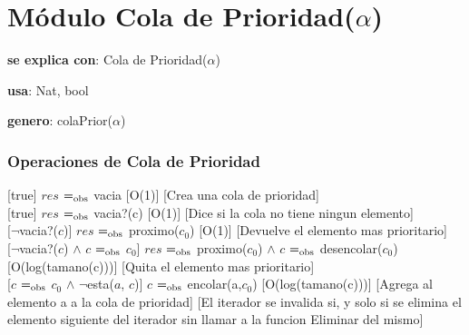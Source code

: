 


\section{Módulo Cola de Prioridad($\alpha$)}

\begin{Interfaz}

  \textbf{se explica con}: Cola de Prioridad($\alpha$)

  \textbf{usa}: Nat, bool
  
  \textbf{genero}: colaPrior($\alpha$)


\subsubsection{Operaciones de Cola de Prioridad}

  [true]
  {$res$ $=_{\mathrm{obs}}$ vacia}
  [O(1)]
  [Crea una cola de prioridad]\\ 
  
  [true]
  {$res$ $=_{\mathrm{obs}}$ vacia?(c)}
  [O(1)]
  [Dice si la cola no tiene ningun elemento]\\ 

  [$\neg$vacia?($c$)]
  {$res$ $=_{\mathrm{obs}}$ proximo($c_0$)}
  [O(1)]
  [Devuelve el elemento mas prioritario]\\   
  
  [$\neg$vacia?($c$) $\land$ $c$ $=_{\mathrm{obs}}$ $c_0$]
  {$res$ $=_{\mathrm{obs}}$ proximo($c_0$) $\land$ $c$ $=_{\mathrm{obs}}$ desencolar($c_0$)}
  [O(log(tamano(c)))]
  [Quita el elemento mas prioritario]\\   
  
  [$c$ $=_{\mathrm{obs}}$ $c_0$ $\land$ $\neg$esta($a$, $c$)] %
  {$c$ $=_{\mathrm{obs}}$ encolar(a,$c_0$)}
  [O(log(tamano(c)))]
  [Agrega al elemento a a la cola de prioridad]
  [El iterador se invalida si, y solo si se elimina el elemento siguiente del iterador sin llamar a la funcion Eliminar del mismo]\\ 

\end{Interfaz}


